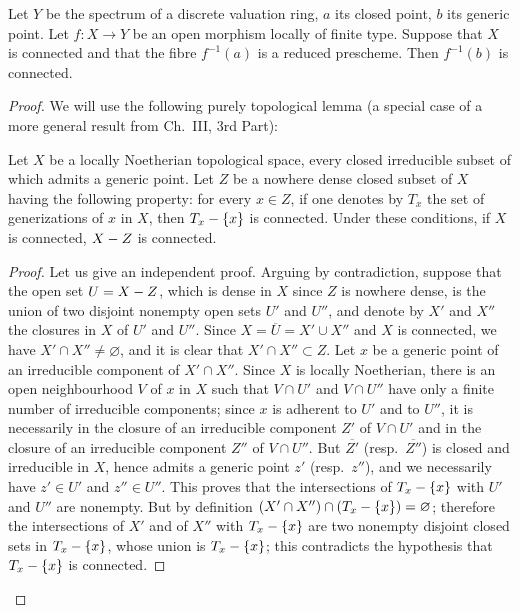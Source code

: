 \begin{lemma}[15.5.6]
\label{IV.15.5.6}
Let $Y$ be the spectrum of a discrete valuation ring, $a$ its closed point, $b$ its generic point.
Let $f:X\to Y$ be an open morphism locally of finite type.
Suppose that $X$ is connected and that the fibre $f^{-1}(a)$ is a reduced prescheme.
Then $f^{-1}(b)$ is connected.
\end{lemma}

\begin{proof}
We will use the following purely topological lemma (a special case of a more general result from Ch.\ III, 3rd Part):

\begin{lemma}[15.5.6.1]
\label{IV.15.5.6.1}
Let $X$ be a locally Noetherian topological space, every closed irreducible subset of which admits a generic point.
Let $Z$ be a nowhere dense closed subset of $X$ having the following property: for every $x\in Z$, if one denotes by $T_x$ the set of generizations of $x$ in $X$, then $T_x-\{x\}$ is connected.
Under these conditions, if $X$ is connected, $X- Z$ is connected.
\end{lemma}

\begin{proof}
Let us give an independent proof.
Arguing by contradiction, suppose that the open set $U=X- Z$, which is dense in $X$ since $Z$ is nowhere dense, is the union of two disjoint nonempty open sets $U'$ and $U''$, and denote by $X'$ and $X''$ the closures in $X$ of $U'$ and $U''$.
Since $X=\overline{U}=X'\cup X''$ and $X$ is connected, we have $X'\cap X''\neq\varnothing$, and it is clear that $X'\cap X''\subset Z$.
Let $x$ be a generic point of an irreducible component of $X'\cap X''$.
Since $X$ is locally Noetherian, there is an open neighbourhood $V$ of $x$ in $X$ such that $V\cap U'$ and $V\cap U''$ have only a finite number of irreducible components; since $x$ is adherent to $U'$ and to $U''$, it is necessarily in the closure of an irreducible component $Z'$ of $V\cap U'$ and in the closure of an irreducible component $Z''$ of $V\cap U''$.
But $\overline{Z'}$ (resp.\ $\overline{Z''}$) is closed and irreducible in $X$, hence admits a generic point $z'$ (resp.\ $z''$), and we necessarily have $z'\in U'$ and $z''\in U''$.
This proves that the intersections of $T_x-\{x\}$ with $U'$ and $U''$ are nonempty.
But by definition $(X'\cap X'')\cap(T_x-\{x\})=\varnothing$; therefore the intersections of $X'$ and of $X''$ with $T_x-\{x\}$ are two nonempty disjoint closed sets in $T_x-\{x\}$, whose union is $T_x-\{x\}$; this contradicts the hypothesis that $T_x-\{x\}$ is connected.
\end{proof}
\end{proof}

